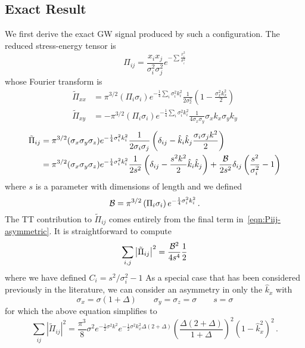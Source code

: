 \documentclass{revtex4}
\begin{document}
\subsection{Exact Result}
We first derive the exact GW signal produced by such a configuration.
The reduced stress-energy tensor is
\begin{equation}
  \Pi_{ij} = \frac{x_ix_j}{\sigma_i^2\sigma_j^2}e^{-\sum\frac{x_i^2}{\sigma_i^2}}
\end{equation}
whose Fourier transform is
\begin{align}
  \tilde{\Pi}_{xx} &= \pi^{3/2}\left(\Pi_i\sigma_i\right)e^{-\frac{1}{4}\sum_i\sigma_i^2k_i^2}\frac{1}{2\sigma_x^2}\left(1-\frac{\sigma_x^2k_x^2}{2}\right) \\
  \tilde{\Pi}_{xy} &= -\pi^{3/2}\left(\Pi_i\sigma_i\right)e^{-\frac{1}{4}\sum_i\sigma_i^2k_i^2}\frac{1}{4\sigma_x\sigma_y}\sigma_xk_x\sigma_yk_y
\end{align}
\begin{align}
  \label{eqn:Piij-asymmetric}
  \tilde{\Pi}_{ij} &= \pi^{3/2}(\sigma_x\sigma_y\sigma_z)e^{-\frac{1}{4}\sigma_i^2k_i^2}\frac{1}{2\sigma_i\sigma_j}\left(\delta_{ij} - \hat{k}_i\hat{k}_j\frac{\sigma_i\sigma_jk^2}{2}\right) \\
  &= \pi^{3/2}(\sigma_x\sigma_y\sigma_z)e^{-\frac{1}{4}\sigma_i^2k_i^2}\frac{1}{2s^2}\left(\delta_{ij}-\frac{s^2k^2}{2}\hat{k}_i\hat{k}_j\right) + \frac{\mathcal{B}}{2s^2}\delta_{ij}\left(\frac{s^2}{\sigma_i^2}-1\right)
\end{align}
where $s$ is a parameter with dimensions of length and we defined
\begin{equation}
  \mathcal{B} = \pi^{3/2}\left(\Pi_i\sigma_i\right)e^{-\frac{1}{4}\sigma_i^2k_i^2} \, .
\end{equation}
The TT contribution to $\tilde{\Pi}_{ij}$ comes entirely from the final term in~\eqref{eqn:Piij-asymmetric}.
It is straightforward to compute
\begin{equation}
  \sum_{i,j}\left|\tilde{\Pi}_{ij}\right|^2 = \frac{\mathcal{B}^2}{4s^4}\frac{1}{2} 
\end{equation}
where we have defined $C_i = s^2/\sigma_i^2 - 1$
As a special case that has been considered previously in the literature, we can consider an asymmetry in only the $\hat{k}_x$ with
\begin{equation}
  \sigma_x = \sigma(1+\Delta) \qquad \sigma_y=\sigma_z = \sigma \qquad s = \sigma
\end{equation}
for which the above equation simplifies to
\begin{equation}
  \sum_{ij}\left|\tilde{\Pi}_{ij}\right|^2 = \frac{\pi^3}{8}\sigma^2e^{-\frac{1}{2}\sigma^2k^2}e^{-\frac{1}{2}\sigma^2k_x^2\Delta(2+\Delta)}\left(\frac{\Delta(2+\Delta)}{1+\Delta}\right)^2\left(1-\hat{k}_x^2\right)^2 \, .
\end{equation}
\end{document}

